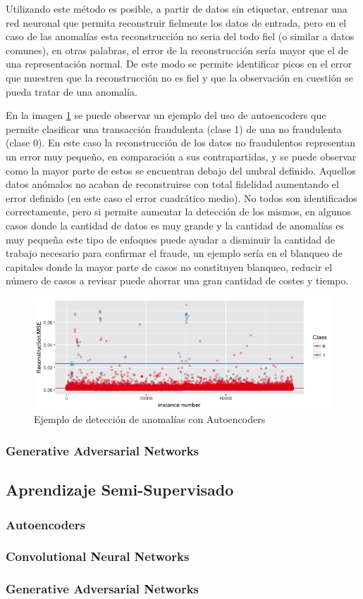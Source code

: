 Utilizando este método es posible, a partir de datos sin etiquetar, entrenar una red neuronal que permita reconstruir fielmente los datos de entrada, pero en el caso de las anomalías esta reconstrucción no seria del todo fiel (o similar a datos comunes), en otras palabras, el error de la reconstrucción sería mayor que el de una representación normal. De este modo se permite identificar picos en el error que muestren que la reconstrucción no es fiel y que la observación en cuestión se pueda tratar de una anomalía.

En la imagen \ref{fig:autoencoderAnomaly} se puede observar un ejemplo del uso de autoencoders que permite clasificar una transacción fraudulenta (clase 1) de una no fraudulenta (clase 0). En este caso la reconstrucción de los datos no fraudulentos representan un error muy pequeño, en comparación a sus contrapartidas, y se puede observar como la mayor parte de estos se encuentran debajo del umbral definido. Aquellos datos anómalos no acaban de reconstruirse con total fidelidad aumentando el error definido (en este caso el error cuadrático medio). No todos son identificados correctamente, pero si permite aumentar la detección de los mismos, en algunos casos donde la cantidad de datos es muy grande y la cantidad de anomalías es muy pequeña este tipo de enfoques puede ayudar a disminuir la cantidad de trabajo necesario para confirmar el fraude, un ejemplo sería en el blanqueo de capitales donde la mayor parte de casos no constituyen blanqueo, reducir el número de casos a revisar puede ahorrar una gran cantidad de costes y tiempo.

\begin{figure}[H]
    \centering
    \includegraphics[width=15cm]{figs/autoencoderAnomalyDetection.png}
    \caption{Ejemplo de detección de anomalías con Autoencoders}
    \label{fig:autoencoderAnomaly}
\end{figure}

\subsubsection{Generative Adversarial Networks}

\subsection{Aprendizaje Semi-Supervisado}
\subsubsection{Autoencoders}
\subsubsection{Convolutional Neural Networks}
\subsubsection{Generative Adversarial Networks}